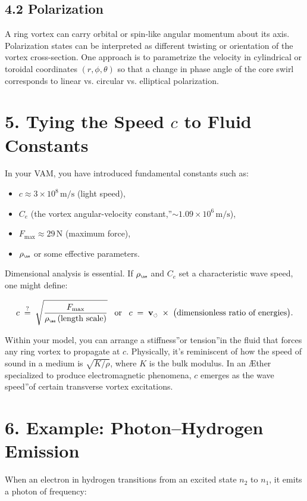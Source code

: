 \subsection*{4.2 Polarization}
A ring vortex can carry orbital or spin-like angular momentum about its axis. Polarization states can be interpreted as different twisting or orientation of the vortex cross-section. One approach is to parametrize the velocity in cylindrical or toroidal coordinates \((r,\phi,\theta)\) so that a change in phase angle of the core swirl corresponds to linear vs. circular vs. elliptical polarization.

\section*{5. Tying the Speed \(c\) to Fluid Constants}
In your VAM, you have introduced fundamental constants such as:

\begin{itemize}
 \item \(c \approx 3\times10^8\,\mathrm{m/s}\) (light speed),
 \item \(C_e\) (the \grqq vortex angular-velocity constant,\textquotedblright \(\sim 1.09\times10^6\,\mathrm{m/s}\)),
 \item \(F_{\max} \approx 29\,\mathrm{N}\) (maximum force),
 \item \(\rho_{\scriptscriptstyle\mathrm{\ae}}\) or some effective parameters.
\end{itemize}

Dimensional analysis is essential. If \(\rho_{\scriptscriptstyle \mathrm{\ae}}\) and \(C_e\) set a characteristic wave speed, one might define:

\[
 c \;\stackrel{?}{=}\; \sqrt{ \frac{F_{\max}}{\rho_{\scriptscriptstyle \mathrm{\ae}}\,(\text{length scale})} } \;\;\;\text{or}\;\;\; c \;=\; \mathbf{v}_{\scriptscriptstyle\boldsymbol{\circlearrowleft}} \;\times\; \bigl(\text{dimensionless ratio of energies}\bigr).
\]

Within your model, you can arrange a \grqq stiffness\textquotedblright or \grqq tension\textquotedblright in the fluid that forces any ring vortex to propagate at \(c\). Physically, it's reminiscent of how the speed of sound in a medium is \(\sqrt{K/\rho}\), where \(K\) is the bulk modulus. In an Æther specialized to produce electromagnetic phenomena, \(c\) emerges as the \grqq wave speed\textquotedblright of certain transverse vortex excitations.

\section*{6. Example: Photon–Hydrogen Emission}
When an electron in hydrogen transitions from an excited state \(n_2\) to \(n_1\), it emits a photon of frequency:

